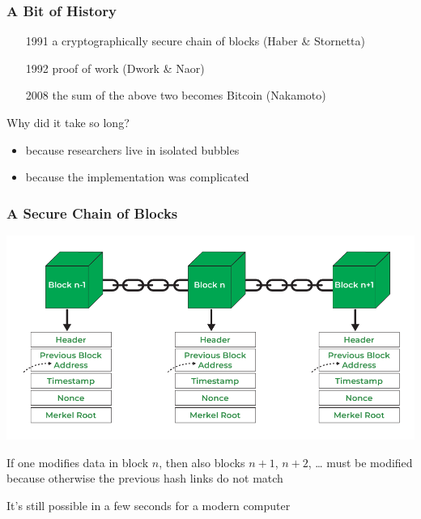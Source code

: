 \documentclass[11pt]{beamer}  %
\begin{document}
\begin{frame}\frametitle{A Bit of History}

  \begin{itemize}
  \item[1991] a cryptographically secure chain of blocks (Haber \& Stornetta)
  \item[1992] proof of work (Dwork \& Naor)
  \item[2008] the sum of the above two becomes Bitcoin (Nakamoto)
  \end{itemize}

  \bigskip

  \begin{greenbox}{Why did it take so long?}
    \begin{itemize}
    \item because researchers live in isolated bubbles
    \item because the implementation was complicated
    \end{itemize}
  \end{greenbox}

\end{frame}

\begin{frame}\frametitle{A Secure Chain of Blocks}

  \begin{center}
    \includegraphics[scale=0.26,clip=false]{pictures/blocks.png}
  \end{center}

  If one modifies data in block $n$, then also blocks $n+1$, $n+2$, \ldots
  must be modified because otherwise the previous hash links do not match

  \medskip

  \begin{redbox}{}
    It's still possible in a few seconds for a modern computer
  \end{redbox}
  
\end{frame}
\end{document}
